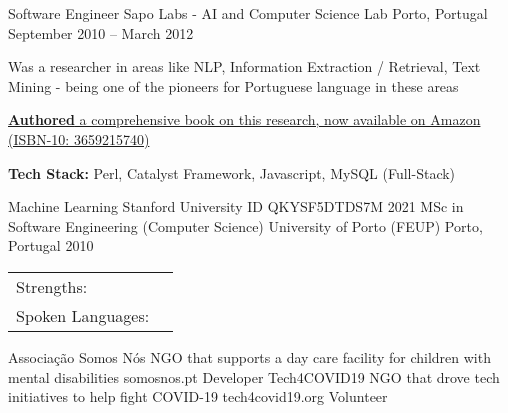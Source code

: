 \documentclass[]{awesome-cv}
\begin{document}
\begin{cventries}
	\vspace{-4mm}
	\cventry
	{Software Engineer}
	{Sapo Labs - AI and Computer Science Lab}
	{Porto, Portugal}
	{September 2010 – March 2012}
	{\begin{cvitems}
		\item {Was a researcher in areas like NLP, Information Extraction / Retrieval, Text Mining - being one of the pioneers for Portuguese language in these areas}
		\item {\href{https://www.amazon.com/Automatic-Extraction-of-Biographical-Data/dp/3659215740}{\textbf{Authored} a comprehensive book on this research, now available on Amazon (ISBN-10: 3659215740)}}
		\item {\textbf{Tech Stack:} Perl, Catalyst Framework, Javascript, MySQL (Full-Stack)}
		\end{cvitems}}
\end{cventries}
\vspace{-5mm}

\vspace{-3mm}
\begin{cvhonors}
	\cvhonor
	{Machine Learning}
	{Stanford University}
	{ID QKYSF5DTDS7M}
	{2021}
	\cvhonor
	{MSc in Software Engineering (Computer Science)}
	{University of Porto (FEUP)}
	{Porto, Portugal}
	{2010}
\end{cvhonors}

\vspace{-3mm}
\begin{cventries}
	\vspace{-2mm}
	\cventry
	{}
	{\def\arraystretch{1.15}{\begin{tabular}{ l l }
		Strengths:  & {\skill{ Leadership, Coaching, Self-Motivation, Problem Solver, Outside-the-box Thinking, Builder, Empowering \& Motivating others }} \\
		Spoken Languages:  & {\skill{ English, Portuguese, French, Spanish, Slovene}} \\
		\end{tabular}}}
	{}
	{}
	{}
\end{cventries}

\vspace{-11mm}

\vspace{-3mm}

\begin{cvhonors}
	\cvhonor
	{Associação Somos Nós}
	{NGO that supports a day care facility for children with mental disabilities}
	{somosnos.pt}
	{Developer}
	\cvhonor
	{Tech4COVID19}
	{NGO that drove tech initiatives to help fight COVID-19}
	{tech4covid19.org}
	{Volunteer}
\end{cvhonors}
\
\end{document}
